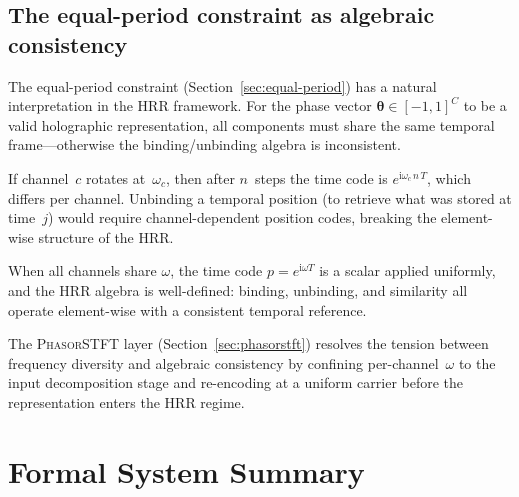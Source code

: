 \documentclass[11pt]{article}
\newcommand{\im}{\mathrm{i}}
\theoremstyle{definition}
\begin{document}
\subsection{The equal-period constraint as algebraic consistency}

The equal-period constraint (Section~\ref{sec:equal-period}) has a
natural interpretation in the HRR framework. For the phase vector
$\bm\theta\in[-1,1]^C$ to be a valid holographic representation,
all components must share the same temporal frame---otherwise the
binding/unbinding algebra is inconsistent.

If channel~$c$ rotates at~$\omega_c$, then after $n$~steps the
time code is $e^{\im\omega_c\,n\,T}$, which differs per channel.
Unbinding a temporal position (to retrieve what was stored at time~$j$)
would require channel-dependent position codes, breaking the
element-wise structure of the HRR.

When all channels share $\omega$, the time code $p = e^{\im\omega T}$
is a scalar applied uniformly, and the HRR algebra is well-defined:
binding, unbinding, and similarity all operate element-wise with a
consistent temporal reference.

The \textsc{PhasorSTFT} layer (Section~\ref{sec:phasorstft}) resolves
the tension between frequency diversity and algebraic consistency by
confining per-channel~$\omega$ to the input decomposition stage and
re-encoding at a uniform carrier before the representation enters the
HRR regime.

\section{Formal System Summary}\label{sec:summary}
\end{document}
